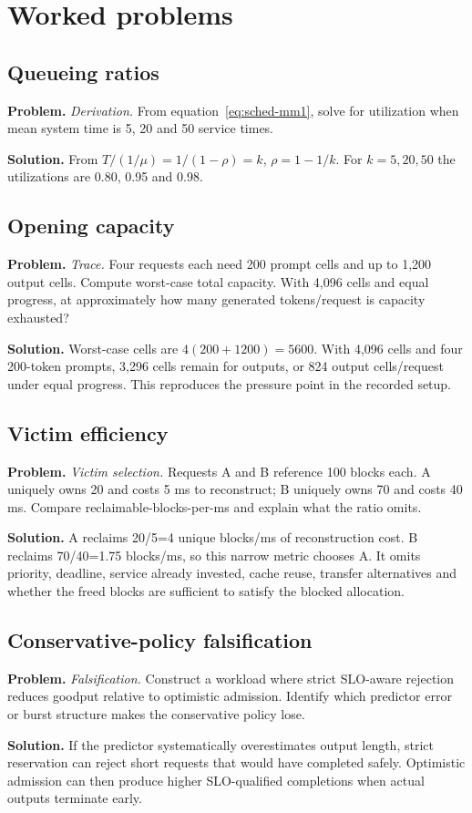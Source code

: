 \section{Worked problems}

\subsection{Queueing ratios}
\textbf{Problem.} \emph{Derivation.} From equation~\eqref{eq:sched-mm1}, solve for utilization
when mean system time is 5, 20 and 50 service times.

\textbf{Solution.} From $T/(1/\mu)=1/(1-\rho)=k$, $\rho=1-1/k$. For $k=5,20,50$ the
utilizations are 0.80, 0.95 and 0.98.

\subsection{Opening capacity}
\textbf{Problem.} \emph{Trace.} Four requests each need 200 prompt cells and up to 1,200 output
cells. Compute worst-case total capacity. With 4,096 cells and equal progress, at
approximately how many generated tokens/request is capacity exhausted?

\textbf{Solution.} Worst-case cells are $4(200+1200)=5600$. With 4,096 cells and four 200-token
prompts, 3,296 cells remain for outputs, or 824 output cells/request under equal
progress. This reproduces the pressure point in the recorded setup.

\subsection{Victim efficiency}
\textbf{Problem.} \emph{Victim selection.} Requests A and B reference 100 blocks each. A uniquely
owns 20 and costs 5 ms to reconstruct; B uniquely owns 70 and costs 40 ms. Compare
reclaimable-blocks-per-ms and explain what the ratio omits.

\textbf{Solution.} A reclaims 20/5=4 unique blocks/ms of reconstruction cost. B reclaims
70/40=1.75 blocks/ms, so this narrow metric chooses A. It omits priority, deadline,
service already invested, cache reuse, transfer alternatives and whether the freed
blocks are sufficient to satisfy the blocked allocation.

\subsection{Conservative-policy falsification}
\textbf{Problem.} \emph{Falsification.} Construct a workload where strict SLO-aware rejection
reduces goodput relative to optimistic admission. Identify which predictor error or
burst structure makes the conservative policy lose.

\textbf{Solution.} If the predictor systematically overestimates output length, strict reservation can
reject short requests that would have completed safely. Optimistic admission can then
produce higher SLO-qualified completions when actual outputs terminate early.
